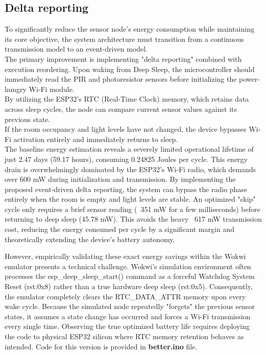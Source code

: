 \documentclass[12pt]{article}
\begin{document}
\subsection{Delta reporting}
To significantly reduce the sensor node's energy consumption while maintaining its core objective, the system architecture must transition from a continuous transmission model to an event-driven model.\\
The primary improvement is implementing "delta reporting" combined with execution reordering. Upon waking from Deep Sleep, the microcontroller should immediately read the PIR and photoresistor sensors before initializing the power-hungry Wi-Fi module.\\
By utilizing the ESP32's RTC (Real-Time Clock) memory, which retains data across sleep cycles, the node can compare current sensor values against its previous state.\\
If the room occupancy and light levels have not changed, the device bypasses Wi-Fi activation entirely and immediately returns to sleep.\\

The baseline energy estimation reveals a severely limited operational lifetime of just 2.47 days (59.17 hours), consuming 0.24825 Joules per cycle. This energy drain is overwhelmingly dominated by the ESP32's Wi-Fi radio, which demands over 600 mW during initialization and transmission. By implementing the proposed event-driven delta reporting, the system can bypass the radio phase entirely when the room is empty and light levels are stable. An optimized "skip" cycle only requires a brief sensor reading (~351 mW for a few milliseconds) before returning to deep sleep (45.78 mW). This avoids the heavy ~617 mW transmission cost, reducing the energy consumed per cycle by a significant margin and theoretically extending the device's battery autonomy.

However, empirically validating these exact energy savings within the Wokwi emulator presents a technical challenge. Wokwi's simulation environment often processes the esp\_deep\_sleep\_start() command as a forceful Watchdog System Reset (rst:0x8) rather than a true hardware deep sleep (rst:0x5). Consequently, the emulator completely clears the RTC\_DATA\_ATTR memory upon every wake cycle. Because the simulated node repeatedly "forgets" the previous sensor states, it assumes a state change has occurred and forces a Wi-Fi transmission every single time. Observing the true optimized battery life requires deploying the code to physical ESP32 silicon where RTC memory retention behaves as intended.
Code for this version is provided in \textbf{better.ino} file.
\end{document}
